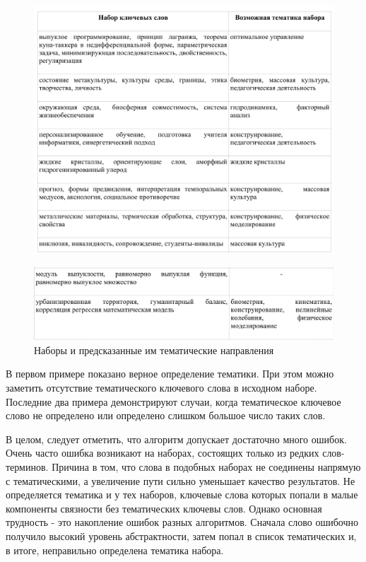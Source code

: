 \begin{figure}[ht]
  \begin{minipage}[ht]{1.0\linewidth}\centering
    \includegraphics[width=1.0\linewidth]{Dissertation/pics/theme_table_1}
  \end{minipage}
  \label{tbl:theme_table_1}
\end{figure}

\begin{figure}[ht]
  \begin{minipage}[ht]{1.0\linewidth}\centering
    \includegraphics[width=1.0\linewidth]{Dissertation/pics/theme_table_2}
    \caption{Наборы и предсказанные им тематические направления}
  \end{minipage}
  \label{tbl:theme_table_2}
\end{figure}

В первом примере показано верное определение тематики. При этом можно заметить отсутствие тематического ключевого слова в исходном наборе. Последние два примера демонстрируют случаи, когда тематическое ключевое слово не определено или определено слишком большое число таких слов.

В целом, следует отметить, что алгоритм допускает достаточно много ошибок. Очень часто ошибка возникают на наборах, состоящих только из редких слов-терминов. Причина в том, что слова в подобных наборах не соединены напрямую с тематическими, а увеличение пути сильно уменьшает качество результатов. Не определяется тематика и у тех наборов, ключевые слова которых попали в малые компоненты связности без тематических ключевы слов. Однако основная трудность - это накопление ошибок разных алгоритмов. Сначала слово ошибочно получило высокий уровень абстрактности, затем попал в список тематических и, в итоге, неправильно определена тематика набора.

